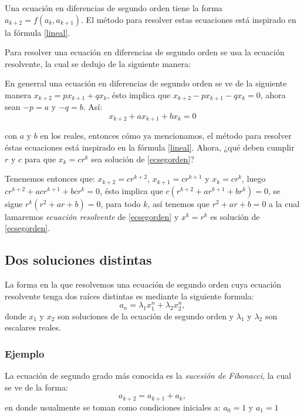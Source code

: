 \documentclass{article}
\begin{document}
Una ecuación en diferencias de segundo orden tiene la forma $a_{k+2}=f(a_k,a_{k+1})$.
El método para resolver estas ecuaciones está inspirado en la fórmula \ref{lineal}.

Para resolver una ecuación en diferencias de segundo orden se usa la
ecuación resolvente, la cual se dedujo de la siguiente manera:

En generral una ecuación en diferencias de segundo orden se ve de la
siguiente manera $x_{k+2}=px_{k+1}+qx_{k}$, ésto implica que
$x_{k+2}-px_{k+1}-qx_{k}=0$, ahora sean $-p=a$ y $-q=b$. Así:
\begin{equation}
  \label{ecsegorden}
  x_{k+2}+ax_{k+1}+bx_{k}=0
\end{equation}

con $a$ y $b$ en los reales, entonces cómo ya mencionamos, el método
para resolver éstas ecuaciones está inspirado en la fórmula
\ref{lineal}. Ahora, ¿qué deben cumplir $r$ y $c$ para que $x_k=cr^k$
sea solución de \ref{ecsegorden}?

Tenenemos entonces que: $x_{k+2}=cr^{k+2}$, $x_{k+1}=cr^{k+1}$ y
$x_{k}=cr^{k}$, luego $cr^{k+2}+acr^{k+1}+bcr^k=0$, ésto implica que
$c(r^{k+2}+ar^{k+1}+br^k)=0$, se sigue $r^k(r^2+ar+b)=0$, para todo
$k$, así tenemos que $r^2+ar+b=0$ a la cual lamaremos \textit{ecuación
  resolvente} de \ref{ecsegorden} y $x^k=r^k$ es solución de
\ref{ecsegorden}.



\subsection{Dos soluciones distintas}
\label{sec:distintas}
La forma en la que resolvemos una ecuación de segundo orden cuya
ecuación resolvente tenga dos raíces distintas es mediante la
siguiente formula:
\begin{equation}
 \label{raicesdistintas}
 a_n=\lambda_1x_1^n +\lambda_2x_2^n,
\end{equation}
donde $x_1$ y $x_2$ son soluciones de la ecuación de segundo orden y
$\lambda_1$ y $\lambda_2$ son escalares reales.
\subsubsection{Ejemplo}

La ecuación de segundo grado más conocida es la \textit{sucesión de
  Fibonacci}, la cual se ve de la forma:
\begin{equation}
  \label{eq:fibonacci}
a_{k+2}=a_{k+1}+a_{k},  
\end{equation}
en donde usualmente se toman como condiciones iniciales a: $a_{0}=1$ y $a_{1}=1$
\end{document}
